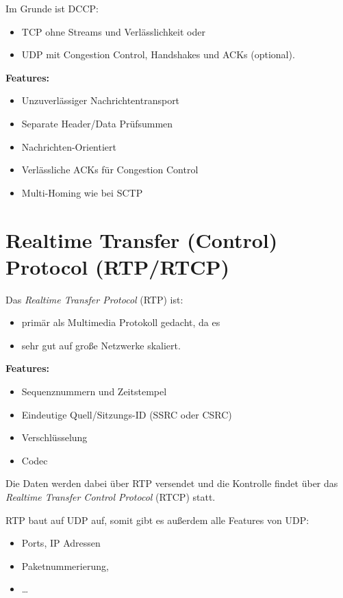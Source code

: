         Im Grunde ist DCCP:
        \begin{itemize}
        	\item TCP ohne Streams und Verlässlichkeit oder
        	\item UDP mit Congestion Control, Handshakes und ACKs (optional).
        \end{itemize}
        
        \textbf{Features:}
        \begin{itemize}
        	\item Unzuverlässiger Nachrichtentransport
        	\item Separate Header/Data Prüfsummen
        	\item Nachrichten-Orientiert
        	\item Verlässliche ACKs für Congestion Control
        	\item Multi-Homing wie bei SCTP
        \end{itemize}

    \section{Realtime Transfer (Control) Protocol (RTP/RTCP)}
        Das \textit{Realtime Transfer Protocol} (RTP) ist:
        \begin{itemize}
        	\item primär als Multimedia Protokoll gedacht, da es
        	\item sehr gut auf große Netzwerke skaliert.
        \end{itemize}
        
        \textbf{Features:}
        \begin{itemize}
        	\item Sequenznummern und Zeitstempel
        	\item Eindeutige Quell/Sitzungs-ID (SSRC oder CSRC)
        	\item Verschlüsselung
        	\item Codec
        \end{itemize}
        
        Die Daten werden dabei über RTP versendet und die Kontrolle findet über das \textit{Realtime Transfer Control Protocol} (RTCP) statt.
        
        RTP baut auf UDP auf, somit gibt es außerdem alle Features von UDP:
        \begin{itemize}
        	\item Ports, IP Adressen
        	\item Paketnummerierung,
        	\item \dots
        \end{itemize}

